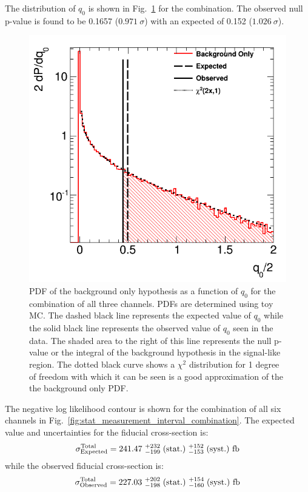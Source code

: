 The distribution of $q_0$ is shown 
in Fig.~\ref{fig:stat_measurement_significance} for the combination.  
The observed null p-value 
is found to be 0.1657 ($0.971~\sigma$) with an 
expected of 0.152 ($1.026~\sigma$).

\begin{figure}[ht!]
\centering
\includegraphics[width=0.70\columnwidth]{figures/combination/significance.png}
\caption{PDF of the background only hypothesis as a function of $q_0$ for the combination of all three channels. PDFs are determined 
using toy MC. The dashed black line represents the expected value of $q_0$ while the solid black line represents the observed value of $q_0$ seen in the data. The shaded area to the right
of this line represents the null p-value or the 
integral of the background hypothesis in the signal-like region.
The dotted black curve shows a $\chi^2$ distribution for 1 degree of freedom with which 
it can be seen is a good approximation of the 
the background only PDF.}
\label{fig:stat_measurement_significance}
\end{figure}

The negative log likelihood contour is shown
for the combination of all six channels in 
Fig.~\ref{fig:stat_measurement_interval_combination}.
The expected value and uncertainties for the fiducial cross-section is:
\begin{equation}
\sigma^{\textrm{Total}}_{\textrm{Expected}} = 241.47 ~ ^{+232}_{-199} \mbox{$\;$(stat.)} ~^{+152}_{-153}\mbox{$\;$(syst.)} ~\textrm{fb}
\end{equation}
while the observed fiducial cross-section is:
\begin{equation}
\sigma^{\textrm{Total}}_{\textrm{Observed}} = 227.03 ~ ^{+202}_{-198} \mbox{$\;$(stat.)} ~^{+154}_{-160} \mbox{$\;$(syst.)} ~\textrm{fb}
\end{equation}

